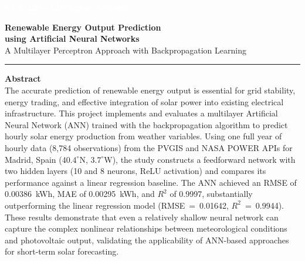 \documentclass[11pt, a4paper]{article}
\begin{document}
\begin{titlepage}
    \centering
    \vspace*{0.5cm}
    
    \begin{tcolorbox}[colback=navyblue, colframe=navyblue, width=\textwidth, sharp corners, halign=center, valign=center, height=2cm]
        \textcolor{white}{\Large \textbf{CCS 229 - Intelligent Systems}}
    \end{tcolorbox}
    
    \vspace*{1.0cm}
    
    {\Huge \textbf{\textcolor{navyblue}{Renewable Energy Output Prediction}}}\\[0.4cm]
    {\LARGE \textbf{\textcolor{navyblue}{using Artificial Neural Networks}}}\\[0.4cm]
    {\Large \textcolor{accentblue}{A Multilayer Perceptron Approach with Backpropagation Learning}}
    \vspace{0.5cm}
    
    {\color{rulecolor}\rule{0.8\textwidth}{1.5pt}}

    \vspace{0.5cm}
    
    \begin{tcolorbox}[colback=lightgray, colframe=rulecolor, boxrule=0.5pt, arc=2mm, width=\textwidth]
        \textbf{\large Abstract}\\[0.2cm]
        \normalsize
        The accurate prediction of renewable energy output is essential for grid stability,
        energy trading, and effective integration of solar power into existing electrical
        infrastructure. This project implements and evaluates a multilayer Artificial Neural
        Network (ANN) trained with the backpropagation algorithm to predict hourly solar
        energy production from weather variables. Using one full year of hourly data
        (8,784 observations) from the PVGIS and NASA POWER APIs for Madrid, Spain
        ($40.4^\circ$N, $3.7^\circ$W), the study constructs a feedforward network with two
        hidden layers (10 and 8 neurons, ReLU activation) and compares its performance
        against a linear regression baseline. The ANN achieved an RMSE of 0.00386~kWh,
        MAE of 0.00295~kWh, and $R^2$ of 0.9997, substantially outperforming the linear
        regression model (RMSE~=~0.01642, $R^2$~=~0.9944). These results demonstrate
        that even a relatively shallow neural network can capture the complex nonlinear
        relationships between meteorological conditions and photovoltaic output, validating
        the applicability of ANN-based approaches for short-term solar forecasting.
        

\end{tcolorbox}
\end{titlepage}
\end{document}
